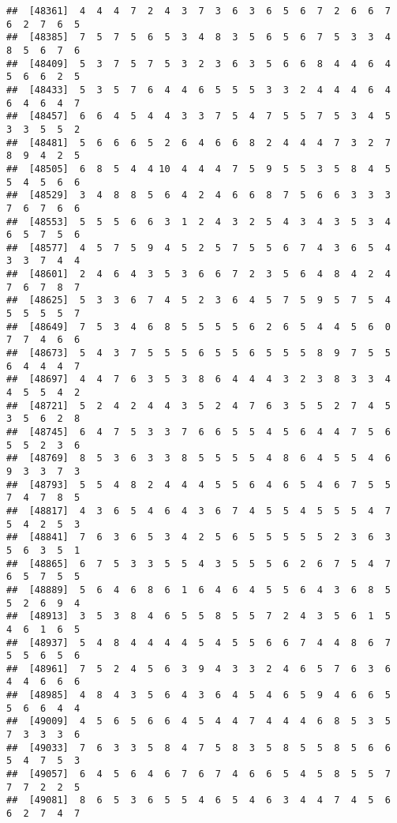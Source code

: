 \documentclass[
]{book}
\begin{document}
\begin{verbatim}
##  [48361]  4  4  4  7  2  4  3  7  3  6  3  6  5  6  7  2  6  6  7  6  2  7  6  5
##  [48385]  7  5  7  5  6  5  3  4  8  3  5  6  5  6  7  5  3  3  4  8  5  6  7  6
##  [48409]  5  3  7  5  7  5  3  2  3  6  3  5  6  6  8  4  4  6  4  5  6  6  2  5
##  [48433]  5  3  5  7  6  4  4  6  5  5  5  3  3  2  4  4  4  6  4  6  4  6  4  7
##  [48457]  6  6  4  5  4  4  3  3  7  5  4  7  5  5  7  5  3  4  5  3  3  5  5  2
##  [48481]  5  6  6  6  5  2  6  4  6  6  8  2  4  4  4  7  3  2  7  8  9  4  2  5
##  [48505]  6  8  5  4  4 10  4  4  4  7  5  9  5  5  3  5  8  4  5  5  4  5  6  6
##  [48529]  3  4  8  8  5  6  4  2  4  6  6  8  7  5  6  6  3  3  3  7  6  7  6  6
##  [48553]  5  5  5  6  6  3  1  2  4  3  2  5  4  3  4  3  5  3  4  6  5  7  5  6
##  [48577]  4  5  7  5  9  4  5  2  5  7  5  5  6  7  4  3  6  5  4  3  3  7  4  4
##  [48601]  2  4  6  4  3  5  3  6  6  7  2  3  5  6  4  8  4  2  4  7  6  7  8  7
##  [48625]  5  3  3  6  7  4  5  2  3  6  4  5  7  5  9  5  7  5  4  5  5  5  5  7
##  [48649]  7  5  3  4  6  8  5  5  5  5  6  2  6  5  4  4  5  6  0  7  7  4  6  6
##  [48673]  5  4  3  7  5  5  5  6  5  5  6  5  5  5  8  9  7  5  5  6  4  4  4  7
##  [48697]  4  4  7  6  3  5  3  8  6  4  4  4  3  2  3  8  3  3  4  4  5  5  4  2
##  [48721]  5  2  4  2  4  4  3  5  2  4  7  6  3  5  5  2  7  4  5  3  5  6  2  8
##  [48745]  6  4  7  5  3  3  7  6  6  5  5  4  5  6  4  4  7  5  6  5  5  2  3  6
##  [48769]  8  5  3  6  3  3  8  5  5  5  5  4  8  6  4  5  5  4  6  9  3  3  7  3
##  [48793]  5  5  4  8  2  4  4  4  5  5  6  4  6  5  4  6  7  5  5  7  4  7  8  5
##  [48817]  4  3  6  5  4  6  4  3  6  7  4  5  5  4  5  5  5  4  7  5  4  2  5  3
##  [48841]  7  6  3  6  5  3  4  2  5  6  5  5  5  5  5  2  3  6  3  5  6  3  5  1
##  [48865]  6  7  5  3  3  5  5  4  3  5  5  5  6  2  6  7  5  4  7  6  5  7  5  5
##  [48889]  5  6  4  6  8  6  1  6  4  6  4  5  5  6  4  3  6  8  5  5  2  6  9  4
##  [48913]  3  5  3  8  4  6  5  5  8  5  5  7  2  4  3  5  6  1  5  4  6  1  6  5
##  [48937]  5  4  8  4  4  4  4  5  4  5  5  6  6  7  4  4  8  6  7  5  5  6  5  6
##  [48961]  7  5  2  4  5  6  3  9  4  3  3  2  4  6  5  7  6  3  6  4  4  6  6  6
##  [48985]  4  8  4  3  5  6  4  3  6  4  5  4  6  5  9  4  6  6  5  5  6  6  4  4
##  [49009]  4  5  6  5  6  6  4  5  4  4  7  4  4  4  6  8  5  3  5  7  3  3  3  6
##  [49033]  7  6  3  3  5  8  4  7  5  8  3  5  8  5  5  8  5  6  6  5  4  7  5  3
##  [49057]  6  4  5  6  4  6  7  6  7  4  6  6  5  4  5  8  5  5  7  7  7  2  2  5
##  [49081]  8  6  5  3  6  5  5  4  6  5  4  6  3  4  4  7  4  5  6  6  2  7  4  7

\end{verbatim}
\end{document}
